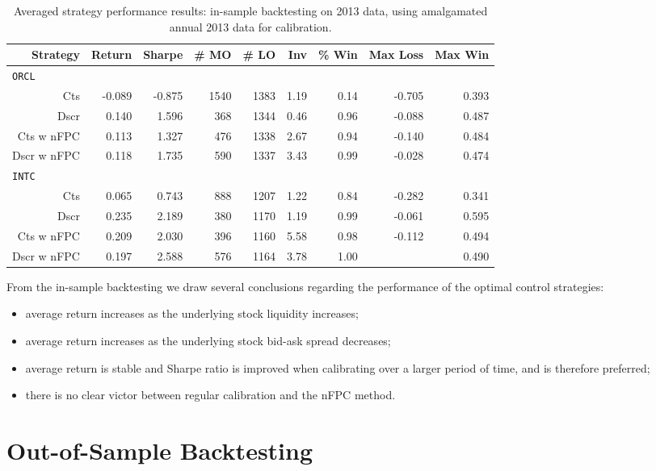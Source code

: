 \begin{table}
\centering
{}
\begin{tabular}{@{} *{9}{r} @{}}
\toprule
Strategy & Return & Sharpe & \# MO & \# LO & Inv & \% Win & Max Loss & Max Win \\
\midrule
\multicolumn{9}{l}{\texttt{ORCL}} \\ 
Cts & -0.089 & -0.875 & 1540 & 1383 & 1.19 & 0.14 & -0.705 & 0.393 \\ 
Dscr & 0.140 & 1.596 & 368 & 1344 & 0.46 & 0.96 & -0.088 & 0.487 \\ 
Cts w nFPC & 0.113 & 1.327 & 476 & 1338 & 2.67 & 0.94 & -0.140 & 0.484 \\ 
Dscr w nFPC & 0.118 & 1.735 & 590 & 1337 & 3.43 & 0.99 & -0.028 & 0.474 \\[2ex]
\multicolumn{9}{l}{\texttt{INTC}} \\ 
Cts & 0.065 & 0.743 & 888 & 1207 & 1.22 & 0.84 & -0.282 & 0.341 \\ 
Dscr & 0.235 & 2.189 & 380 & 1170 & 1.19 & 0.99 & -0.061 & 0.595 \\ 
Cts w nFPC & 0.209 & 2.030 & 396 & 1160 & 5.58 & 0.98 & -0.112 & 0.494 \\ 
Dscr w nFPC & 0.197 & 2.588 & 576 & 1164 & 3.78 & 1.00 &  & 0.490 \\ 
\bottomrule
\end{tabular}
\caption{Averaged strategy performance results: in-sample backtesting on 2013 data, using amalgamated annual 2013 data for calibration.}
\label{tbl:IS_annual}
\end{table}

From the in-sample backtesting we draw several conclusions regarding the performance of the optimal control strategies:
\begin{itemize}
\item average return increases as the underlying stock liquidity increases;
\item average return increases as the underlying stock bid-ask spread decreases;
\item average return is stable and Sharpe ratio is improved when calibrating over a larger period of time, and is therefore preferred;
\item there is no clear victor between regular calibration and the nFPC method.
\end{itemize}

\FloatBarrier
\section{Out-of-Sample Backtesting}

